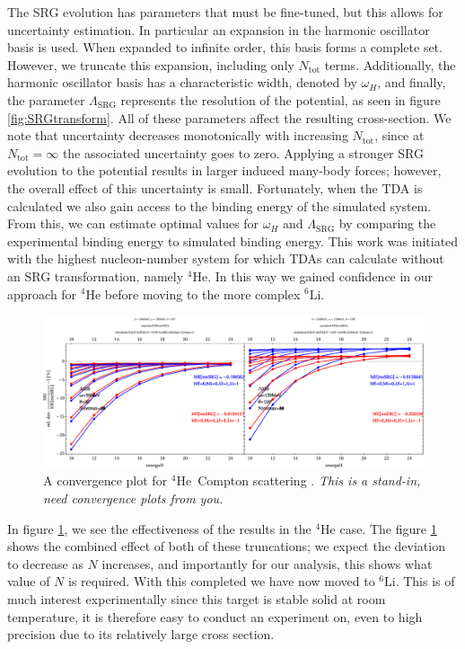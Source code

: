 \documentclass[a4paper,11pt]{article}
\newcommand{\Ntot}{N_{\mathrm{tot}}}
\newcommand{\LamSRG}{\Lambda_{\mathrm{SRG}}}
\newcommand{\LiS}{{}^{6} \mathrm{Li} }
\newcommand{\HeF}{{}^{4} \mathrm{He}}
\newcommand{\ques}[1]{\color{red}\textit{ #1 }\color{black}}
\begin{document}
The SRG evolution has parameters that must be fine-tuned, but this allows for uncertainty estimation.
In particular an expansion in the harmonic oscillator basis is used.
When expanded to infinite order, this basis forms a complete set. However, we truncate
this expansion, including only $N_{\mathrm{tot}}$ terms.
Additionally, the harmonic oscillator basis has a characteristic
width, denoted by $\omega_H$, and finally, the parameter $\LamSRG$
represents the resolution of the potential, as seen in figure
\ref{fig:SRGtransform}. 
All of these parameters affect the resulting cross-section. 
We note that uncertainty decreases monotonically with increasing $\Ntot$, since at $\Ntot=\infty$ the associated uncertainty goes to zero.
Applying a stronger SRG evolution to the potential results in larger induced many-body forces; however, the overall
effect of this uncertainty is small.
Fortunately, when the TDA is calculated we also gain access to the binding energy of the simulated system.
From this, we can estimate optimal values for $\omega_H$ and $\LamSRG$ by comparing the experimental binding energy to simulated binding energy.
This work was initiated with the highest nucleon-number system for which  TDAs can
calculate without an SRG transformation, namely
$\HeF$. In this way we gained confidence in our approach for $\HeF$ before moving
to the more complex $\LiS$.
\begin{figure}[H]
  \begin{center}
    \includegraphics[width=\linewidth]{SRG-Converge-Double.pdf}
    \caption{A convergence plot for $\HeF$\, Compton scattering
    .\ques{This is a stand-in, need convergence plots from you.}}
    \label{fig:SRGConverge4He}
  \end{center}
\end{figure}
In figure \ref{fig:SRGConverge4He}, we see the effectiveness of the results in the $\HeF$ case.
The figure \ref{fig:SRGConverge4He} shows the combined effect of both of these truncations; we expect the deviation to decrease as $N$ increases, and importantly for our analysis, this shows what value of $N$ is required.
With this completed we have now moved to $\LiS$.
This is of much interest experimentally since this target is stable solid at room temperature,
it is therefore easy to conduct an experiment on, even to high precision due to its relatively large
cross section.
\end{document}
